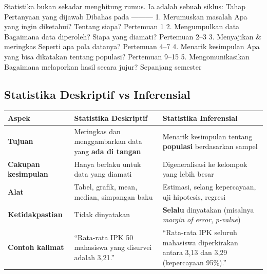 \documentclass[
  indonesian,
  letterpaper,
]{book}
\newcounter{none} %
\begin{document}
Statistika bukan sekadar menghitung rumus. Ia adalah sebuah siklus:
\textbar{} Tahap \textbar{} Pertanyaan yang dijawab \textbar{} Dibahas
pada \textbar{} \textbar---\textbar---\textbar---\textbar{} \textbar{}
1. Merumuskan masalah \textbar{} Apa yang ingin diketahui? Tentang
siapa? \textbar{} Pertemuan 1 \textbar{} \textbar{} 2. Mengumpulkan data
\textbar{} Bagaimana data diperoleh? Siapa yang diamati? \textbar{}
Pertemuan 2--3 \textbar{} \textbar{} 3. Menyajikan \& meringkas
\textbar{} Seperti apa pola datanya? \textbar{} Pertemuan 4--7
\textbar{} \textbar{} 4. Menarik kesimpulan \textbar{} Apa yang bisa
dikatakan tentang populasi? \textbar{} Pertemuan 9--15 \textbar{}
\textbar{} 5. Mengomunikasikan \textbar{} Bagaimana melaporkan hasil
secara jujur? \textbar{} Sepanjang semester \textbar{}

\subsection{Statistika Deskriptif vs
Inferensial}\label{statistika-deskriptif-vs-inferensial}

{\def\LTcaptype{none} %
\begin{longtable}[]{@{}
  >{\raggedright\arraybackslash}p{}
  >{\raggedright\arraybackslash}p{}
  >{\raggedright\arraybackslash}p{}@{}}
\toprule\noalign{}
\begin{minipage}[b]{\linewidth}\raggedright
Aspek
\end{minipage} & \begin{minipage}[b]{\linewidth}\raggedright
Statistika Deskriptif
\end{minipage} & \begin{minipage}[b]{\linewidth}\raggedright
Statistika Inferensial
\end{minipage} \\
\midrule\noalign{}
\endhead
\bottomrule\noalign{}
\endlastfoot
\textbf{Tujuan} & Meringkas dan menggambarkan data yang \textbf{ada di
tangan} & Menarik kesimpulan tentang \textbf{populasi} berdasarkan
sampel \\
\textbf{Cakupan kesimpulan} & Hanya berlaku untuk data yang diamati &
Digeneralisasi ke kelompok yang lebih besar \\
\textbf{Alat} & Tabel, grafik, mean, median, simpangan baku & Estimasi,
selang kepercayaan, uji hipotesis, regresi \\
\textbf{Ketidakpastian} & Tidak dinyatakan & \textbf{Selalu} dinyatakan
(misalnya \emph{margin of error}, \emph{p-value}) \\
\textbf{Contoh kalimat} & ``Rata-rata IPK 50 mahasiswa yang disurvei
adalah 3,21.'' & ``Rata-rata IPK seluruh mahasiswa diperkirakan antara
3,13 dan 3,29 (kepercayaan 95\%).'' \\
\end{longtable}
}
\end{document}
